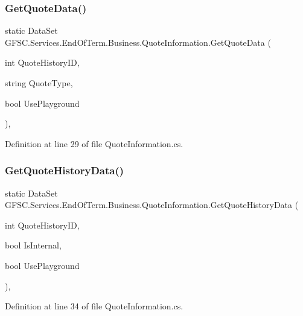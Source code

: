 \subsubsection{\texorpdfstring{Get\+Quote\+Data()}{GetQuoteData()}}
{\footnotesize\ttfamily static Data\+Set G\+F\+S\+C.\+Services.\+End\+Of\+Term.\+Business.\+Quote\+Information.\+Get\+Quote\+Data (\begin{DoxyParamCaption}\item[{int}]{Quote\+History\+ID,  }\item[{string}]{Quote\+Type,  }\item[{bool}]{Use\+Playground }\end{DoxyParamCaption})\hspace{0.3cm}{\ttfamily [static]}, {\ttfamily [package]}}



Definition at line 29 of file Quote\+Information.\+cs.

\mbox{\label{class_g_f_s_c_1_1_services_1_1_end_of_term_1_1_business_1_1_quote_information_a71befa60389b0814575b33e584bc358d}} 
\subsubsection{\texorpdfstring{Get\+Quote\+History\+Data()}{GetQuoteHistoryData()}}
{\footnotesize\ttfamily static Data\+Set G\+F\+S\+C.\+Services.\+End\+Of\+Term.\+Business.\+Quote\+Information.\+Get\+Quote\+History\+Data (\begin{DoxyParamCaption}\item[{int}]{Quote\+History\+ID,  }\item[{bool}]{Is\+Internal,  }\item[{bool}]{Use\+Playground }\end{DoxyParamCaption})\hspace{0.3cm}{\ttfamily [static]}, {\ttfamily [package]}}



Definition at line 34 of file Quote\+Information.\+cs.

